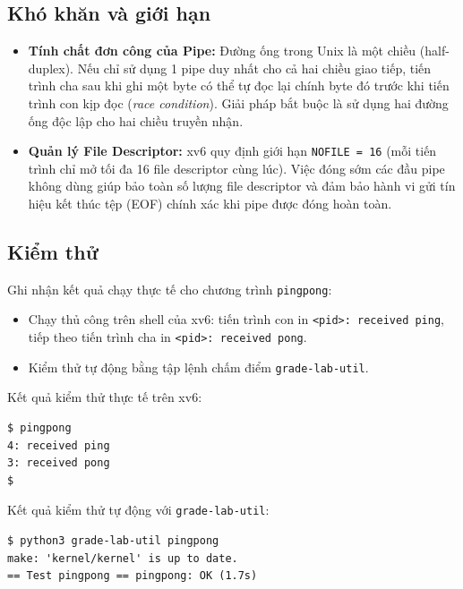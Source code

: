 \subsection{Khó khăn và giới hạn}
\begin{itemize}
  \item \textbf{Tính chất đơn công của Pipe:} Đường ống trong Unix là một chiều (half-duplex). Nếu chỉ sử dụng 1 pipe duy nhất cho cả hai chiều giao tiếp, tiến trình cha sau khi ghi một byte có thể tự đọc lại chính byte đó trước khi tiến trình con kịp đọc (\textit{race condition}). Giải pháp bắt buộc là sử dụng hai đường ống độc lập cho hai chiều truyền nhận.
  \item \textbf{Quản lý File Descriptor:} xv6 quy định giới hạn \texttt{NOFILE = 16} (mỗi tiến trình chỉ mở tối đa 16 file descriptor cùng lúc). Việc đóng sớm các đầu pipe không dùng giúp bảo toàn số lượng file descriptor và đảm bảo hành vi gửi tín hiệu kết thúc tệp (EOF) chính xác khi pipe được đóng hoàn toàn.
\end{itemize}

\subsection{Kiểm thử}
Ghi nhận kết quả chạy thực tế cho chương trình \texttt{pingpong}:
\begin{itemize}
  \item Chạy thủ công trên shell của xv6: tiến trình con in \texttt{<pid>: received ping}, tiếp theo tiến trình cha in \texttt{<pid>: received pong}.
  \item Kiểm thử tự động bằng tập lệnh chấm điểm \texttt{grade-lab-util}.
\end{itemize}

\noindent Kết quả kiểm thử thực tế trên xv6:

\begin{center}
\begin{minipage}{0.86\textwidth}
\begin{lstlisting}[numbers=none,xleftmargin=0pt,framexleftmargin=0pt]
$ pingpong
4: received ping
3: received pong
$
\end{lstlisting}
\end{minipage}
\end{center}

\noindent Kết quả kiểm thử tự động với \texttt{grade-lab-util}:

\begin{center}
\begin{minipage}{0.86\textwidth}
\begin{lstlisting}[numbers=none,xleftmargin=0pt,framexleftmargin=0pt]
$ python3 grade-lab-util pingpong
make: 'kernel/kernel' is up to date.
== Test pingpong == pingpong: OK (1.7s) 
\end{lstlisting}
\end{minipage}
\end{center}

